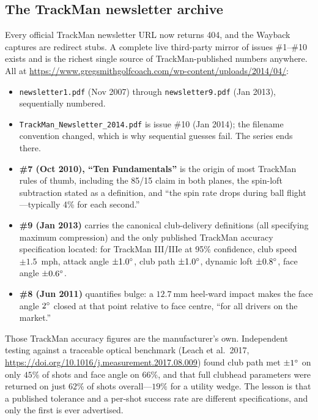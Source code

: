 \subsection{The TrackMan newsletter archive}

Every official TrackMan newsletter URL now returns 404, and the Wayback
captures are redirect stubs. A complete live third-party mirror of issues
\#1--\#10 exists and is the richest single source of TrackMan-published
numbers anywhere. All at
\url{https://www.gregsmithgolfcoach.com/wp-content/uploads/2014/04/}:

\begin{itemize}\itemsep2pt
\item \texttt{newsletter1.pdf} (Nov 2007) through \texttt{newsletter9.pdf}
  (Jan 2013), sequentially numbered.
\item \texttt{TrackMan\_Newsletter\_2014.pdf} is issue \#10 (Jan 2014); the
  filename convention changed, which is why sequential guesses fail. The
  series ends there.
\item \textbf{\#7 (Oct 2010), ``Ten Fundamentals''} is the origin of most
  TrackMan rules of thumb, including the 85/15 claim in both planes, the
  spin-loft subtraction stated as a definition, and ``the spin rate drops
  during ball flight---typically 4\% for each second.''
\item \textbf{\#9 (Jan 2013)} carries the canonical club-delivery
  definitions (all specifying maximum compression) and the only published
  TrackMan accuracy specification located: for TrackMan III/IIIe at 95\%
  confidence, club speed $\pm1.5$~mph, attack angle $\pm1.0\si{\degree}$, club path
  $\pm1.0\si{\degree}$, dynamic loft $\pm0.8\si{\degree}$, face angle $\pm0.6\si{\degree}$.
\item \textbf{\#8 (Jun 2011)} quantifies bulge: a $\SI{12.7}{\milli\metre}$
  heel-ward impact makes the face angle $2\si{\degree}$ closed at that point
  relative to face centre, ``for all drivers on the market.''
\end{itemize}

\begin{warning}
Those TrackMan accuracy figures are the manufacturer's own. Independent
testing against a traceable optical benchmark
(Leach et al.\ 2017,
\url{https://doi.org/10.1016/j.measurement.2017.08.009}) found club
path met $\pm1\si{\degree}$ on
only $45\%$ of shots and face angle on $66\%$, and that full clubhead
parameters were returned on just $62\%$ of shots overall---$19\%$ for a
utility wedge. The lesson is that a published tolerance and a
per-shot success rate are different specifications, and only the first is
ever advertised.
\end{warning}

